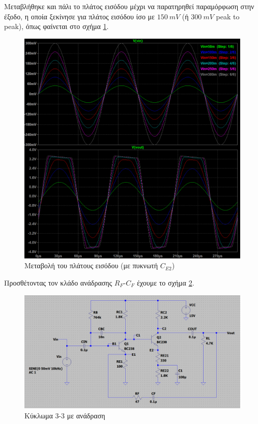 \documentclass[11pt,a4paper,twoside,onecolumn,openright,final]{memoir}
\begin{document}
Μεταβλήθηκε και πάλι το πλάτος εισόδου μέχρι να παρατηρηθεί παραμόρφωση στην έξοδο, η οποία ξεκίνησε για πλάτος εισόδου ίσο με \(150 \ mV\) (ή \(300\ mV\) peak to peak), όπως φαίνεται στο σχήμα \ref{fig:ex3plot5}.
\begin{figure}[H]
\centerfloat%
\includegraphics[width=12.0cm]{figures/exercise3_2apokopi.png}
\caption{Μεταβολή του πλάτους εισόδου (με πυκνωτή \(C_{E2}\))}\label{fig:ex3plot5}
\end{figure}

Προσθέτοντας τον κλάδο ανάδρασης $R_F$-$C_F$ έχουμε το σχήμα \ref{fig:ex3circuit3}.
\begin{figure}[H]
\centerfloat
\includegraphics[width=12.0cm]{figures/exercise3circuit3.png}
\caption{Κύκλωμα 3-3 με ανάδραση}
\label{fig:ex3circuit3}
\end{figure}
\end{document}
